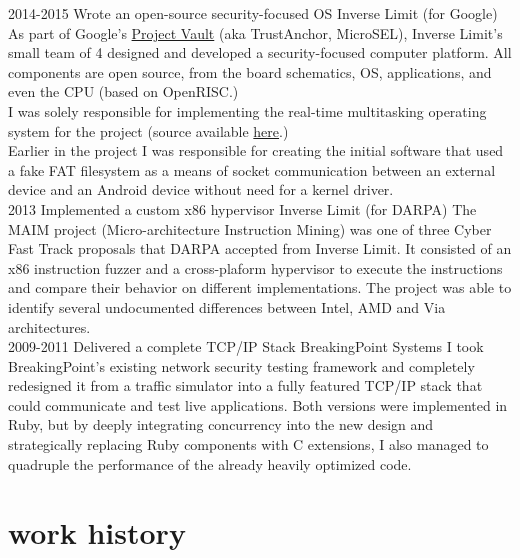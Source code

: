 \documentclass[]{friggeri-cv}
\begin{document}
\begin{entrylist}
  \entry
      {2014-2015}
      {Wrote an open-source security-focused OS}
      {Inverse Limit (for Google)}
      {
        As part of Google's \href{http://goo.gl/5mZrVR}{Project Vault} (aka TrustAnchor, MicroSEL), Inverse Limit's small team of 4 designed and developed a security-focused computer platform. All components are open source, from the board schematics, OS, applications, and even the CPU (based on OpenRISC.)\\
        
        I was solely responsible for implementing the real-time multitasking operating system for the project (source available \href{http://goo.gl/0pbsk7}{here}.)\\
        
        Earlier in the project I was responsible for creating the initial software that used a fake FAT filesystem as a means of socket communication between an external device and an Android device without need for a kernel driver.\\

      }
  \entry
      {2013}
      {Implemented a custom x86 hypervisor}
      {Inverse Limit (for DARPA)}
      {The MAIM project (Micro-architecture Instruction Mining) was one of three Cyber Fast Track proposals that DARPA accepted from Inverse Limit. It consisted of an x86 instruction fuzzer and a cross-plaform hypervisor to execute the instructions and compare their behavior on different implementations. The project was able to identify several undocumented differences between Intel, AMD and Via architectures.\\

      }
  \entry
      {2009-2011}
      {Delivered a complete TCP/IP Stack}
      {BreakingPoint Systems}
      {I took BreakingPoint's existing network security testing framework and completely redesigned it from a traffic simulator into a fully featured TCP/IP stack that could communicate and test live applications. Both versions were implemented in Ruby, but by deeply integrating concurrency into the new design and strategically replacing Ruby components with C extensions, I also managed to quadruple the performance of the already heavily optimized code.}
\end{entrylist}
\newpage

\section{work history}
\end{document}
